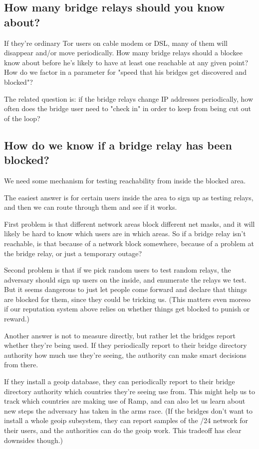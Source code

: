 \documentclass{llncs}
\begin{document}
\subsection{How many bridge relays should you know about?}

If they're ordinary Tor users on cable modem or DSL, many of them will
disappear and/or move periodically. How many bridge relays should a
blockee know
about before he's likely to have at least one reachable at any given point?
How do we factor in a parameter for "speed that his bridges get discovered
and blocked"?

The related question is: if the bridge relays change IP addresses
periodically, how often does the bridge user need to "check in" in order
to keep from being cut out of the loop?

\subsection{How do we know if a bridge relay has been blocked?}

We need some mechanism for testing reachability from inside the
blocked area.

The easiest answer is for certain users inside the area to sign up as
testing relays, and then we can route through them and see if it works.

First problem is that different network areas block different net masks,
and it will likely be hard to know which users are in which areas. So
if a bridge relay isn't reachable, is that because of a network block
somewhere, because of a problem at the bridge relay, or just a temporary
outage?

Second problem is that if we pick random users to test random relays, the
adversary should sign up users on the inside, and enumerate the relays
we test. But it seems dangerous to just let people come forward and
declare that things are blocked for them, since they could be tricking
us. (This matters even moreso if our reputation system above relies on
whether things get blocked to punish or reward.)

Another answer is not to measure directly, but rather let the bridges
report whether they're being used. If they periodically report to their
bridge directory authority how much use they're seeing, the authority
can make smart decisions from there.

If they install a geoip database, they can periodically report to their
bridge directory authority which countries they're seeing use from. This
might help us to track which countries are making use of Ramp, and can
also let us learn about new steps the adversary has taken in the arms
race. (If the bridges don't want to install a whole geoip subsystem, they
can report samples of the /24 network for their users, and the authorities
can do the geoip work. This tradeoff has clear downsides though.)
\end{document}
